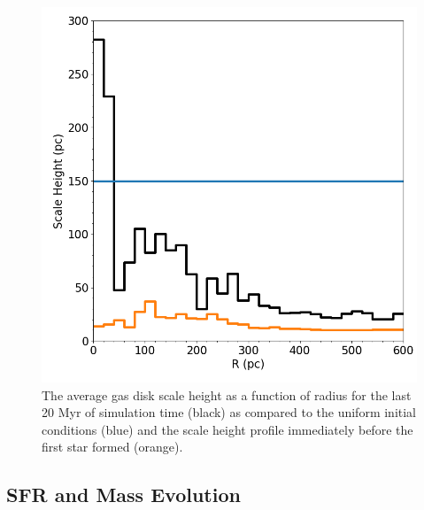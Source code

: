 \documentclass[twocolumn]{aastex61}
\begin{document}
\begin{figure}
\centering
\includegraphics[width=0.975\linewidth]{scale_height}
\caption{The average gas disk scale height as a function of radius for the last 20 Myr of simulation time (black) as compared to the uniform initial conditions (blue) and the scale height profile immediately before the first star formed (orange).}
\label{fig:scale_height}
\end{figure}

\subsection{SFR and Mass Evolution}
\label{sec:sfr}
\end{document}
